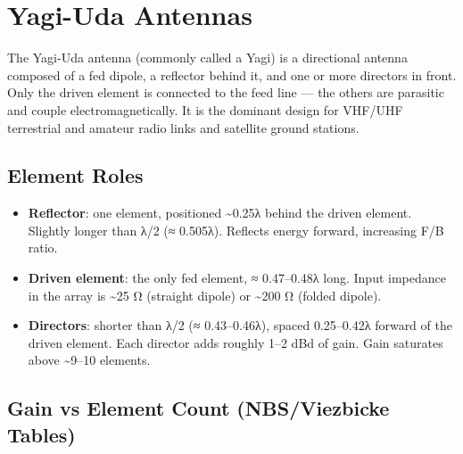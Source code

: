 \section{Yagi-Uda Antennas}\label{sec:wiki_yagi}



The Yagi-Uda antenna (commonly called a Yagi) is a directional antenna composed of a fed dipole, a reflector behind it, and one or more directors in front. Only the driven element is connected to the feed line — the others are parasitic and couple electromagnetically. It is the dominant design for VHF/UHF terrestrial and amateur radio links and satellite ground stations.

				

\subsection{Element Roles}

				
\begin{itemize}

					\item \textbf{Reflector}: one element, positioned \textasciitilde{}0.25λ behind the driven element. Slightly longer than λ/2 (≈ 0.505λ). Reflects energy forward, increasing F/B ratio.

					\item \textbf{Driven element}: the only fed element, ≈ 0.47–0.48λ long. Input impedance in the array is \textasciitilde{}25 Ω (straight dipole) or \textasciitilde{}200 Ω (folded dipole).

					\item \textbf{Directors}: shorter than λ/2 (≈ 0.43–0.46λ), spaced 0.25–0.42λ forward of the driven element. Each director adds roughly 1–2 dBd of gain. Gain saturates above \textasciitilde{}9–10 elements.

				
\end{itemize}

				


				

\subsection{Gain vs Element Count (NBS/Viezbicke Tables)}

				


